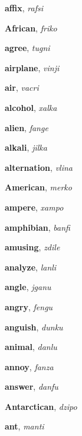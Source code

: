 \documentclass[12pt]{book}
\begin{document}
\begin{description}
\item[ ] \textbf{affix}, \textit{rafsi}

\item[ ] \textbf{African}, \textit{friko}

\item[ ] \textbf{agree}, \textit{tugni}

\item[ ] \textbf{airplane}, \textit{vinji}

\item[ ] \textbf{air}, \textit{vacri}

\item[ ] \textbf{alcohol}, \textit{xalka}

\item[ ] \textbf{alien}, \textit{fange}

\item[ ] \textbf{alkali}, \textit{jilka}

\item[ ] \textbf{alternation}, \textit{vlina}

\item[ ] \textbf{American}, \textit{merko}

\item[ ] \textbf{ampere}, \textit{xampo}

\item[ ] \textbf{amphibian}, \textit{banfi}

\item[ ] \textbf{amusing}, \textit{zdile}

\item[ ] \textbf{analyze}, \textit{lanli}

\item[ ] \textbf{angle}, \textit{jganu}

\item[ ] \textbf{angry}, \textit{fengu}

\item[ ] \textbf{anguish}, \textit{dunku}

\item[ ] \textbf{animal}, \textit{danlu}

\item[ ] \textbf{annoy}, \textit{fanza}

\item[ ] \textbf{answer}, \textit{danfu}

\item[ ] \textbf{Antarctican}, \textit{dzipo}

\item[ ] \textbf{ant}, \textit{manti}


\end{description}
\end{document}
